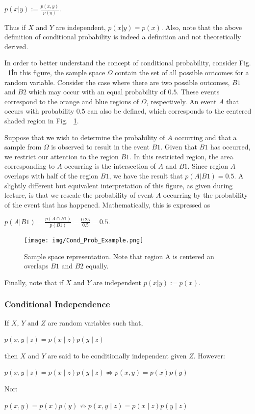 \documentclass[twoside]{article}
\begin{document}
\begin{center}
$p(x|y):=\frac{p(x,y)}{p(y)}.$
\end{center}

Thus if $X$ and $Y$ are independent, $p(x|y)=p(x)$. Also, note that the above definition of conditional probability is indeed a definition and not theoretically derived.

In order to better understand the concept of conditional probability, consider Fig. ~\ref{fig:cond_prob_example}\. In this figure, the sample space $\Omega$ contain the set of all possible outcomes for a random variable. Consider the case where there are two possible outcomes, $B1$ and $B2$ which may occur with an equal probability of $0.5$. These events correspond to the orange and blue regions of $\Omega$, respectively. An event $A$ that occurs with probability $0.5$ can also be defined, which corresponds to the centered shaded region in Fig. ~\ref{fig:cond_prob_example}.

Suppose that we wish to determine the probability of $A$ occurring and that a sample from $\Omega$ is observed to result in the event $B1$. Given that $B1$ has occurred, we restrict our attention to the region $B1$. In this restricted region, the area corresponding to $A$ occurring is the intersection of $A$ and $B1$. Since region $A$ overlaps with half of the region $B1$, we have the result that $p(A|B1) = 0.5.$ A slightly different but equivalent interpretation of this figure, as given during lecture, is that we rescale the probability of event $A$ occurring by the probability of the event that has happened. Mathematically, this is expressed as

\begin{center}
$p(A|B1)=\frac{p(A \cap B1)}{p(B1)}=\frac{0.25}{0.5}=0.5.$
\end{center}

\begin{figure}[h!]
	\centering
    \texttt{[image: img/Cond\_Prob\_Example.png]}
    \caption{Sample space representation. Note that region A is centered an overlaps $B1$ and $B2$ equally.}
    \label{fig:cond_prob_example}
\end{figure}

Finally, note that if $X$ and $Y$ are independent $p(x|y):=p(x)$.
\subsubsection{Conditional Independence}
If $X$, $Y$ and $Z$ are random variables such that,
\begin{center}
$p(x,y \mid z)=p(x \mid z)p(y \mid z)$
\end{center}
then $X$ and $Y$ are said to be conditionally independent given $Z$. \newline
However:
\begin{center}
$p(x,y \mid z)=p(x \mid z)p(y \mid z) \not \Rightarrow p(x,y)=p(x)p(y)$
\end{center}
Nor:
\begin{center}
$p(x,y)=p(x)p(y) \not \Rightarrow p(x,y \mid z)=p(x \mid z)p(y \mid z)$
\end{center}
\end{document}
